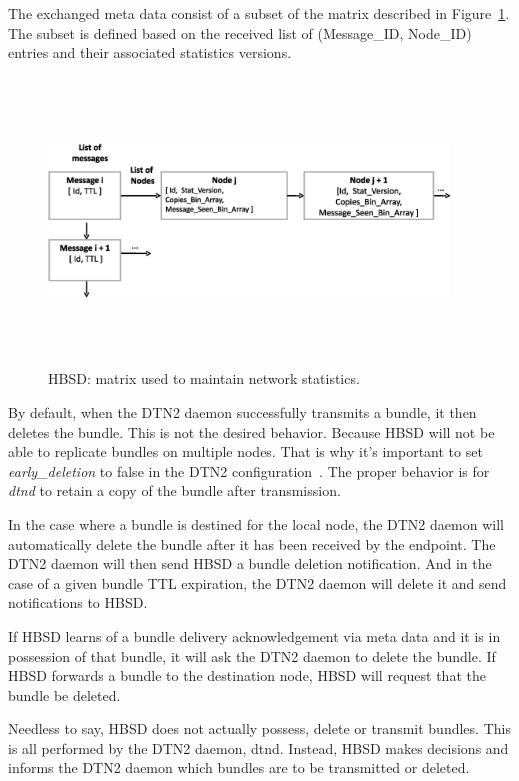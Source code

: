 The exchanged meta data consist of a subset of the matrix described in Figure~\ref{Stat-Mat}. The subset is defined based on the received list of (Message\_ID, Node\_ID) entries and their associated statistics versions.


\begin{figure}[!h]
\centering
\includegraphics[width=4.2in,height=3in]{Chapitre4/Stat_Matrix.eps}
\caption{HBSD: matrix used to maintain network statistics.}
\label{Stat-Mat}
\end{figure}

By default, when the DTN2 daemon successfully transmits a bundle, it then deletes the bundle. This is not the desired behavior. Because HBSD will not be able to replicate bundles on multiple nodes. That is why it's important to set \emph{early\_deletion} to false in the DTN2 configuration~\cite{HBSDDTN2}. The proper behavior is for \emph{dtnd} to retain a copy of the bundle after transmission.

In the case where a bundle is destined for the local node, the DTN2 daemon will automatically delete the bundle after it has been received by the endpoint. The DTN2 daemon will then send HBSD a bundle deletion notification. And in the case of a given bundle TTL expiration, the DTN2 daemon will delete it and send notifications to HBSD.

If HBSD learns of a bundle delivery acknowledgement via meta data and it is in possession of that bundle, it will ask the DTN2 daemon to delete the bundle. If HBSD forwards a bundle to the destination node, HBSD will request that the bundle be deleted.

Needless to say, HBSD does not actually possess, delete or transmit bundles. This is all performed by the DTN2 daemon, dtnd. Instead, HBSD makes decisions and informs the DTN2 daemon which bundles are to be transmitted or deleted.

